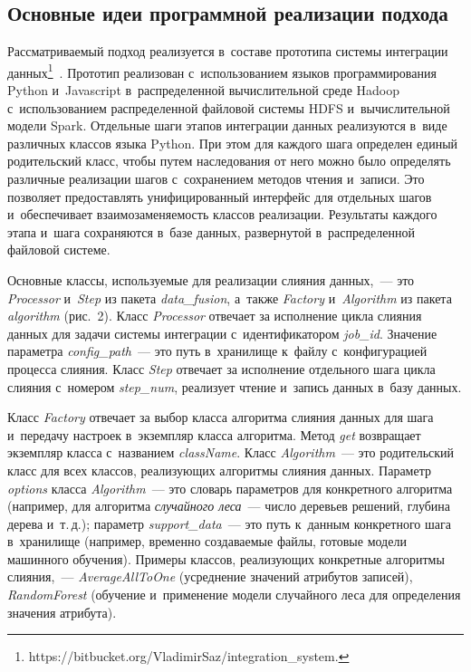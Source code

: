\begin{multicols}{2}
\subsection{Основные идеи программной реализации подхода}

    Рассматриваемый подход реализуется в~со\-ста\-ве прототипа сис\-те\-мы 
интеграции данных\footnote{{\sf 
https://bitbucket.org/VladimirSaz/integration\_system}.}~\cite{3-ste, 5-ste}. 
\mbox{Прототип} реализован с~использованием языков программирования Python и~Javascript в~распределенной вычислительной среде Hadoop с~использованием 
распределенной файловой сис\-те\-мы HDFS и~вы\-чис\-ли\-тель\-ной модели Spark. 
Отдельные шаги этапов интеграции данных реализуются в~виде различных 
классов языка Python. При этом для каж\-до\-го шага определен единый 
родительский класс, чтобы путем наследования от него можно было 
определять различные реализации шагов с~сохранением методов чтения 
и~записи. Это поз\-во\-ля\-ет предостав\-лять унифицированный интерфейс для 
отдельных шагов и~обеспечивает вза\-и\-мо\-за\-ме\-ня\-емость классов реализации. 
Результаты каж\-до\-го этапа и~шага сохраняются в~базе данных, развернутой 
в~распределенной фай\-ло\-вой сис\-теме. 
    
    Основные классы, используемые для реализации слияния данных,~--- 
это \textit{Processor} и~\textit{Step} из пакета \textit{data\_fusion}, а~также 
\textit{Factory} и~\textit{Algorithm} из пакета \textit{algorithm} (рис.~2). Класс 
\textit{Processor} отвечает за исполнение цик\-ла слияния данных для задачи 
системы интеграции с~идентификатором \textit{job\_id}. Значение па\-ра\-мет\-ра 
\textit{config\_path}~--- это путь в~хранилище к~файлу с~конфигурацией 
процесса слияния. Класс \textit{Step} отвечает за исполнение отдельного шага 
цикла слияния с~номером \textit{step\_num}, реализует чтение и~запись 
данных в~базу данных. 

     
    
    Класс \textit{Factory} отвечает за выбор класса алгоритма слияния 
данных для шага и~передачу настроек в~экземпляр класса алгоритма. Метод 
\textit{get} возвращает экземпляр класса с~названием \textit{className}. Класс 
\textit{Algorithm}~--- это родительский класс для всех классов, ре\-а\-ли\-зу\-ющих 
алгоритмы слияния данных. Параметр \textit{options} класса 
\textit{Algorithm}~--- это словарь па\-ра\-мет\-ров для конкретного алгоритма 
(например, для алгоритма \textit{случайного леса}~--- число деревьев 
решений, глубина дерева и~т.\,д.); параметр \textit{support\_data}~--- 
это путь к~данным конкретного шага в~хранилище (например, 
временно создаваемые файлы, готовые модели машинного обучения). 
Примеры классов, реализующих конкретные алгоритмы слияния,~--- 
\textit{AverageAllToOne} (усред\-не\-ние значений атрибутов записей), 
\textit{RandomForest} (обучение и~применение модели случайного леса для 
определения значения атрибута). 


\end{multicols}
